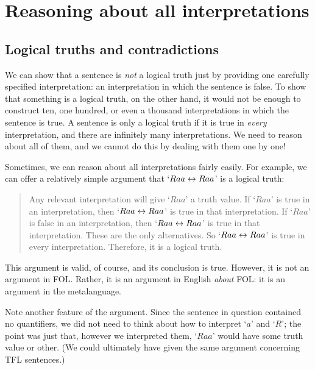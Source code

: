 \chapter{Reasoning about all interpretations}

\section{Logical truths and contradictions}
We can show that a sentence is \emph{not} a logical truth just by providing one carefully specified interpretation: an interpretation in which the sentence is false. To show that something is a logical truth, on the other hand, it would not be enough to construct ten, one hundred, or even a thousand interpretations in which the sentence is true. A sentence is only a logical truth if it is true in \emph{every} interpretation, and there are infinitely many interpretations. We need to reason about all of them, and we cannot do this by dealing with them one by one!

Sometimes, we can reason about all interpretations fairly easily. For example, we can offer a relatively simple argument that `$Raa\leftrightarrow Raa$' is a logical truth:
	\begin{quote}
		\label{allmodels1}
		Any relevant interpretation will give `$Raa$' a truth value. If `$Raa$' is true in an interpretation, then `$Raa \leftrightarrow Raa$' is true in that interpretation. If `$Raa$' is false in an interpretation, then `$Raa \leftrightarrow Raa$' is true in that interpretation. These are the only alternatives. So `$Raa \leftrightarrow Raa$' is true in every interpretation. Therefore, it is a logical truth.
	\end{quote}
This argument is valid, of course, and its conclusion is true. However, it is not an argument in FOL. Rather, it is an argument in English \emph{about} FOL: it is an argument in the metalanguage. 

Note another feature of the argument. Since the sentence in question contained no quantifiers, we did not need to think about how to interpret `$a$' and `$R$'; the point was just that, however we interpreted them, `$Raa$' would have some truth value or other. (We could ultimately have given the same argument concerning TFL sentences.)

